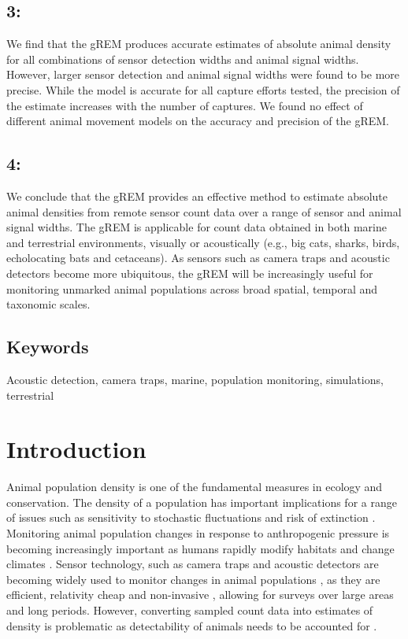 \documentclass[a4paper,10pt,reqno,oneside]{amsart}
\begin{document}
\subsection*{3:} We find that the gREM produces accurate estimates of absolute animal density for all combinations of sensor detection widths and animal signal widths. However, larger sensor detection and animal signal widths were found to be more precise. While the model is accurate for all capture efforts tested, the precision of the estimate increases with the number of captures. We found no effect of different animal movement models on the accuracy and precision of the gREM.  

\subsection*{4:} We conclude that the gREM provides an effective method to estimate absolute animal densities from remote sensor count data over a range of sensor and animal signal widths. The gREM is applicable for count data obtained in both marine and terrestrial environments, visually or acoustically (e.g., big cats, sharks, birds, echolocating bats and cetaceans). As sensors such as camera traps and acoustic detectors become more ubiquitous, the gREM will be increasingly useful for monitoring unmarked animal populations across broad spatial, temporal and taxonomic scales. 

\subsection*{Keywords} %
Acoustic detection, camera traps, marine, population monitoring, simulations, terrestrial 

\section*{Introduction}

Animal population density is one of the fundamental measures in ecology and conservation. The density of a population has important implications for a range of issues such as sensitivity to stochastic fluctuations \citep{richter1972extinction, wright1983stochastic} and risk of extinction \citep{purvis2000predicting}. Monitoring animal population changes in response to anthropogenic pressure is becoming increasingly important as humans rapidly modify habitats and change climates \citep{everatt2014trophic}. Sensor technology, such as camera traps \citep{karanth1995estimating, rowcliffe2008surveys} and acoustic detectors \citep{clark1995application, acevedo2006using, walters2012continental} are becoming widely used to monitor changes in animal populations \citep{rowcliffe2008surveys, kessel2014review, walters2013challenges}, as they are efficient, relativity cheap and non-invasive \citep{cutler1999using}, allowing for surveys over large areas and long periods. However, converting sampled count data into estimates of density is problematic as detectability of animals needs to be accounted for \citep{anderson2001need}.
\end{document}
